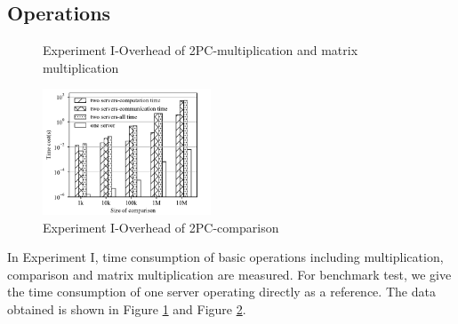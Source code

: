 \documentclass[letterpaper]{article} %
\begin{document}
    \subsection{Operations}
    \begin{figure}[htbp]
        \caption{Experiment I-Overhead of 2PC-multiplication and matrix multiplication}
        \label{multiplication and matrix multiplication}
    \end{figure}
    \begin{figure}[htbp]
        \centering
        \includegraphics[width=5cm]{operation_compare.pdf}
        \caption{Experiment I-Overhead of 2PC-comparison}
        \label{operation_compare}
    \end{figure}
    In Experiment I, time consumption of basic operations including multiplication, comparison and matrix multiplication are measured.
    For benchmark test, we give the time consumption of one server operating directly as a reference.
    The data obtained is shown in Figure \ref{multiplication and matrix multiplication} and Figure \ref{operation_compare}.
\end{document}
